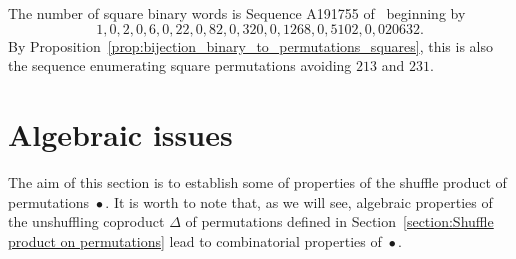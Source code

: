 \documentclass[a4paper]{llncs}
\DeclareMathOperator{\SHUFFLE}{\bullet}
\begin{document}
The number of square binary words is Sequence A191755 of~\cite{Slo}
beginning by
\begin{equation}
1, 0, 2, 0, 6, 0, 22, 0, 82, 0, 320, 0, 1268, 0, 5102, 0, 020632.
\end{equation}
By Proposition~\ref{prop:bijection_binary_to_permutations_squares}, this
is also the sequence enumerating square permutations avoiding $213$
and $231$.


\section{Algebraic issues}
\label{section:Algebraic issues}
The aim of this section is to establish some of properties of the
shuffle product of permutations $\SHUFFLE$. It is worth to note that, as
we will see, algebraic properties of the unshuffling coproduct $\Delta$
of permutations defined in
Section~\ref{section:Shuffle product on permutations} lead to
combinatorial properties of $\SHUFFLE$.
\end{document}
